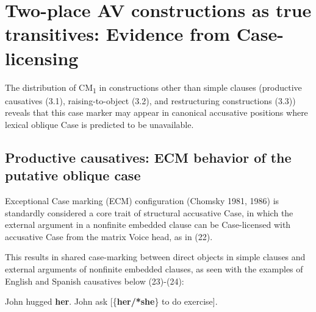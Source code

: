 \documentclass[10pt]{article}
\begin{document}
\section{Two-place AV constructions as true transitives: Evidence from Case-licensing}

\noindent The distribution of CM\textsubscript{1} in constructions other than simple clauses (productive causatives (3.1), raising-to-object (3.2), and restructuring constructions (3.3)) reveals that this case marker may appear in canonical accusative positions where lexical oblique Case is predicted to be unavailable.   

\subsection{Productive causatives: ECM behavior of the putative oblique case}

\noindent Exceptional Case marking (ECM) configuration (Chomsky 1981, 1986) is standardly considered a core trait of structural accusative Case, in which the external argument in a nonfinite embedded clause can be Case-licensed with accusative Case from the matrix Voice head, as in (22). 


\begin{exe}
\ex


\end{exe}

\noindent This results in shared case-marking between direct objects in simple clauses and external arguments of nonfinite embedded clauses, as seen with the examples of English and Spanish causatives below (23)-(24):

\begin{exe}
\begin{xlist}
\ex John hugged \textbf{her}.
\ex John ask [\{\textbf{{her/*she}}\} to do exercise].

\end{xlist}
\end{exe}
\end{document}
